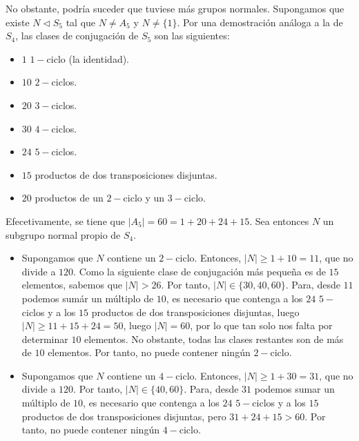 \begin{ejercicio}
\begin{enumerate}
        No obstante, podría suceder que tuviese más grupos normales. Supongamos que existe $N\lhd S_5$ tal que $N\neq A_5$ y $N\neq \{1\}$. Por una demostración análoga a la de $S_4$, las clases de conjugación de $S_5$ son las siguientes:
        \begin{itemize}
            \item $1$ $1-$ciclo (la identidad).
            \item $10$ $2-$ciclos.
            \item $20$ $3-$ciclos.
            \item $30$ $4-$ciclos.
            \item $24$ $5-$ciclos.
            \item $15$ productos de dos transposiciones disjuntas.
            \item $20$ productos de un $2-$ciclo y un $3-$ciclo.
        \end{itemize}

        Efecetivamente, se tiene que $|A_5|=60=1+20+24+15$. Sea entonces $N$ un subgrupo normal propio de $S_4$.
        \begin{itemize}
            \item Supongamos que $N$ contiene un $2-$ciclo. Entonces, $|N|\geq 1+10=11$, que no divide a $120$. Como la siguiente clase de conjugación más pequeña es de $15$ elementos, sabemos que $|N|>26$. Por tanto, $|N|\in \{30,40,60\}$. Para, desde $11$ podemos sumár un múltiplo de $10$, es necesario que contenga a los $24$ $5-$ciclos y a los $15$ productos de dos transposiciones disjuntas, luego $|N|\geq 11+15+24=50$, luego $|N|=60$, por lo que tan solo nos falta por determinar $10$ elementos. No obstante, todas las clases restantes son de más de $10$ elementos. Por tanto, no puede contener ningún $2-$ciclo.
            
            \item Supongamos que $N$ contiene un $4-$ciclo. Entonces, $|N|\geq 1+30=31$, que no divide a $120$. Por tanto, $|N|\in \{40,60\}$. Para, desde $31$ podemos sumar un múltiplo de $10$, es necesario que contenga a los $24$ $5-$ciclos y a los $15$ productos de dos transposiciones disjuntas, pero $31+24+15>60$. Por tanto, no puede contener ningún $4-$ciclo.
            


\end{itemize}
\end{enumerate}
\end{ejercicio}

